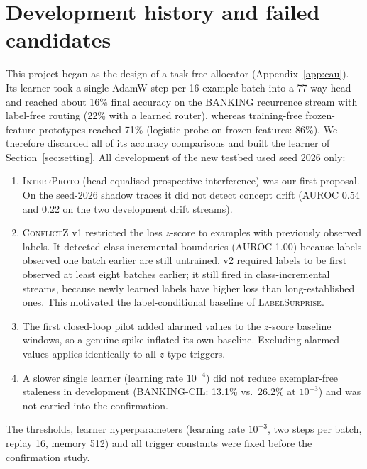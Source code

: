 \documentclass[10pt]{article}
\newcommand{\ls}{\textsc{LabelSurprise}}
\begin{document}
\section{Development history and failed candidates}
\label{app:history}
This project began as the design of a task-free allocator (Appendix~\ref{app:cau}). Its learner took a single AdamW step per 16-example batch into a 77-way head and reached about 16\% final accuracy on the BANKING recurrence stream with label-free routing (22\% with a learned router), whereas training-free frozen-feature prototypes reached 71\% (logistic probe on frozen features: 86\%). We therefore discarded all of its accuracy comparisons and built the learner of Section~\ref{sec:setting}. All development of the new testbed used seed 2026 only:
\begin{enumerate}
\item \textsc{InterfProto} (head-equalised prospective interference) was our first proposal. On the seed-2026 shadow traces it did not detect concept drift (AUROC 0.54 and 0.22 on the two development drift streams).
\item \textsc{ConflictZ} v1 restricted the loss $z$-score to examples with previously observed labels. It detected class-incremental boundaries (AUROC 1.00) because labels observed one batch earlier are still untrained. v2 required labels to be first observed at least eight batches earlier; it still fired in class-incremental streams, because newly learned labels have higher loss than long-established ones. This motivated the label-conditional baseline of \ls{}.
\item The first closed-loop pilot added alarmed values to the $z$-score baseline windows, so a genuine spike inflated its own baseline. Excluding alarmed values applies identically to all $z$-type triggers.
\item A slower single learner (learning rate $10^{-4}$) did not reduce exemplar-free staleness in development (BANKING-CIL: 13.1\% vs.\ 26.2\% at $10^{-3}$) and was not carried into the confirmation.
\end{enumerate}
The thresholds, learner hyperparameters (learning rate $10^{-3}$, two steps per batch, replay 16, memory 512) and all trigger constants were fixed before the confirmation study.
\end{document}
